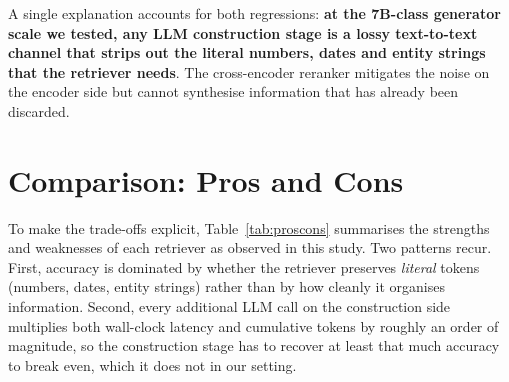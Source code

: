 \documentclass[11pt]{article}
\begin{document}
A single explanation accounts for both regressions:
\textbf{at the 7B-class generator scale we tested, any LLM
construction stage is a lossy text-to-text channel that strips out
the literal numbers, dates and entity strings that the retriever
needs}. The cross-encoder reranker mitigates the noise on the
encoder side but cannot synthesise information that has already
been discarded.

\section{Comparison: Pros and Cons}
\label{sec:compare}

To make the trade-offs explicit, Table~\ref{tab:proscons} summarises
the strengths and weaknesses of each retriever as observed in this
study. Two patterns recur. First, accuracy is dominated by whether
the retriever preserves \emph{literal} tokens (numbers, dates,
entity strings) rather than by how cleanly it organises information.
Second, every additional LLM call on the construction side multiplies
both wall-clock latency and cumulative tokens by roughly an order of
magnitude, so the construction stage has to recover at least that
much accuracy to break even, which it does not in our setting.
\end{document}
